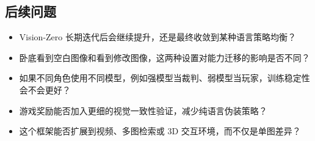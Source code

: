\subsection{后续问题}

\begin{itemize}
    \item Vision-Zero 长期迭代后会继续提升，还是最终收敛到某种语言策略均衡？
    \item 卧底看到空白图像和看到修改图像，这两种设置对能力迁移的影响是否不同？
    \item 如果不同角色使用不同模型，例如强模型当裁判、弱模型当玩家，训练稳定性会不会更好？
    \item 游戏奖励能否加入更细的视觉一致性验证，减少纯语言伪装策略？
    \item 这个框架能否扩展到视频、多图检索或 3D 交互环境，而不仅是单图差异？
\end{itemize}
